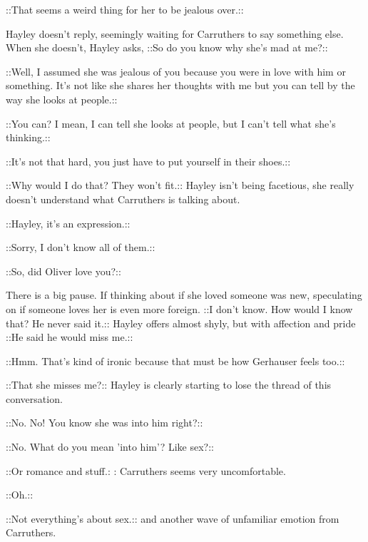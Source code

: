  {\color[RGB]{153,0,255}::That seems a weird thing for her to be jealous over.::} 

Hayley doesn't reply, seemingly waiting for Carruthers to say something else.  When she doesn't, Hayley asks, {\color[RGB]{255,153,0} ::So do you know why she's mad at me?::} 

 {\color[RGB]{153,0,255}::Well, I assumed she was jealous of you because you were in love with him or something.  It's not like she shares her thoughts with me but you can tell by the way she looks at people.::} 

 {\color[RGB]{255,153,0}::You can?  I mean, I can tell she looks at people, but I can't tell what she's thinking.::  } 

 {\color[RGB]{153,0,255}::It's not that hard, you just have to put yourself in their shoes.::} 

 {\color[RGB]{255,153,0}::Why would I do that?  They won't fit.:: }  Hayley isn't being facetious, she really doesn't understand what Carruthers is talking about.

 {\color[RGB]{153,0,255}::Hayley, it's an expression.::} 

 {\color[RGB]{255,153,0}::Sorry, I don't know all of them.::} 

 {\color[RGB]{153,0,255}::So, did Oliver love you?::} 

There is a big pause.  If thinking about if she loved someone was new, speculating on if someone loves her is even more foreign.  {\color[RGB]{255,153,0} ::I don't know.  How would I know that?  He never said it.::}   Hayley offers almost shyly, but with affection and pride  {\color[RGB]{255,153,0}::He said he would miss me.::} 

 {\color[RGB]{153,0,255}::Hmm.  That's kind of ironic because that must be how Gerhauser feels too.::} 

 {\color[RGB]{255,153,0}::That she misses me?:: }  Hayley is clearly starting to lose the thread of this conversation.

 {\color[RGB]{153,0,255}::No. No!  You know she was into him right?::} 

 {\color[RGB]{255,153,0}::No.   What do you mean 'into him'?  Like sex?:: } 

 {\color[RGB]{153,0,255}::Or romance and stuff.:} : Carruthers seems very uncomfortable.

 {\color[RGB]{255,153,0}::Oh.::} 

 {\color[RGB]{153,0,255}::Not everything's about sex.::}  and another wave of unfamiliar emotion from Carruthers.

